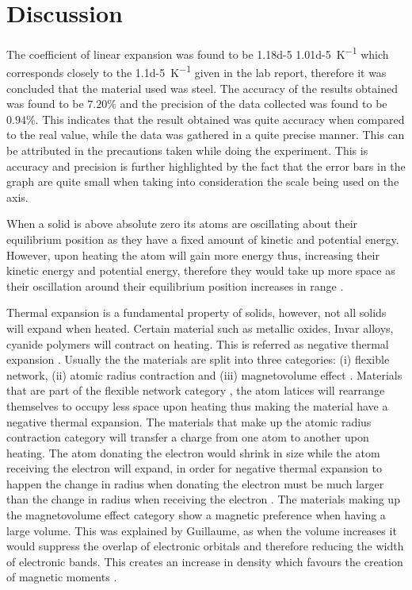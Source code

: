 \documentclass[12pt, a4paper]{article}
\begin{document}
\section*{Discussion}
The coefficient of linear expansion was found to be \num{1.18d-5} \textpm \qty{1.01d-5}{\kelvin^{-1}} which corresponds closely to the \qty{1.1d-5}{\kelvin^{-1}} given in the lab report, therefore it was concluded that the material used was steel. The accuracy of the results obtained was found to be $7.20\%$ and the precision of the data collected was found to be $0.94\%$. This indicates that the result obtained was quite accuracy when compared to the real value, while the data was gathered in a quite precise manner. This can be attributed in the precautions taken while doing the experiment. This is accuracy and precision is further highlighted by the fact that the error bars in the graph are quite small when taking into consideration the scale being used on the axis.

\medskip
\noindent
When a solid is above absolute zero its atoms are oscillating about their equilibrium position as they have a fixed amount of kinetic and potential energy. However, upon heating the atom will gain more energy thus, increasing their kinetic energy and potential energy, therefore they would take up more space as their oscillation around their equilibrium position increases in range \parencite{muncaster}.

\smallskip
\noindent
Thermal expansion is a fundamental property of solids, however, not all solids will expand when heated. Certain material such as metallic oxides, Invar alloys, cyanide polymers will contract on heating. This is referred as negative thermal expansion \parencite{miller2009negative}. Usually the the materials are split into three categories: (i) flexible network, (ii) atomic radius contraction and (iii) magnetovolume effect \parencite{NTE}. Materials that are part of the flexible network category , the atom latices will rearrange themselves to occupy less space upon heating thus making the material have a negative thermal expansion. The materials that make up the atomic radius contraction category will transfer a charge from one atom to another upon heating. The atom donating the electron would shrink in size while the atom receiving the electron will expand, in order for negative thermal expansion to happen the change in radius when donating the electron must be much larger than the change in radius when receiving the electron \parencite{NTE}. The materials making up the magnetovolume effect category show a magnetic preference when having a large volume. This was explained by Guillaume, as when the volume increases it would suppress the overlap of electronic orbitals and therefore reducing the width of electronic bands. This creates an increase in density which favours the creation of magnetic moments \parencite{NTE}.
\end{document}
